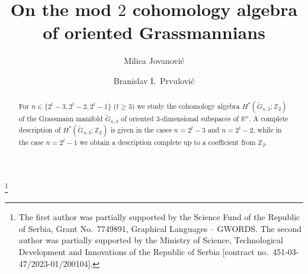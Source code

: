 \documentclass{amsart}
\theoremstyle{definition}
\theoremstyle{remark}
\numberwithin{equation}{section}
\begin{document}
\title[On the mod $2$ cohomology algebra of oriented Grassmannians]{On the mod $2$ cohomology algebra of oriented Grassmannians}

\author{Milica Jovanovi\'c}
\address{University of Belgrade,
  Faculty of mathematics,
  Studentski trg 16,
  Belgrade,
  Serbia}

\author{Branislav I.\ Prvulovi\'c}
\address{University of Belgrade,
  Faculty of mathematics,
  Studentski trg 16,
  Belgrade,
  Serbia}

\thanks{The first author was partially supported by the Science Fund of the Republic of Serbia, Grant No.\ 7749891, Graphical Languages -- GWORDS. The second author was partially supported by the Ministry of Science, Technological Development and Innovations of the Republic of Serbia [contract no.\ 451-03-47/2023-01/200104].}





\begin{abstract}
For $n\in\{2^t-3,2^t-2,2^t-1\}$ ($t\ge3$) we study the cohomology algebra $H^*(\widetilde G_{n,3};\mathbb Z_2)$ of the Grassmann manifold $\widetilde G_{n,3}$ of oriented $3$-dimensional subspaces of $\mathbb R^n$. A complete description of $H^*(\widetilde G_{n,3};\mathbb Z_2)$ is given in the cases $n=2^t-3$ and $n=2^t-2$, while in the case $n=2^t-1$ we obtain a description complete up to a coefficient from $\mathbb Z_2$.
\end{abstract}

\maketitle

\end{document}
